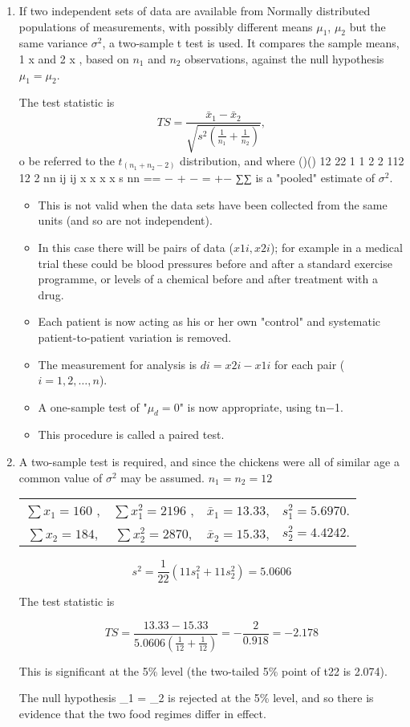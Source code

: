 \documentclass[a4paper,12pt]{article}
\begin{document}
\begin{enumerate} 
\item If two independent sets of data are available from Normally distributed populations of measurements, with possibly different means $\mu_1$, $\mu_2$ but the same variance $\sigma^2$, a two-sample t test is used.  It compares the sample means, 1 x and 2 x , based on $n_1$ and $n_2$ observations, against the null hypothesis $\mu_1 = \mu_2$. 
 
The test statistic is 
\[ TS = \frac{\bar{x}_1 - \bar{x}_2}{ \sqrt{ s^2 \left(  \frac{1}{n_1} + \frac{1}{n_2}  \right)} }, \]
o be referred to the $t_(n_1+n_2-2)$ distribution, and where 
 ()() 12 22 1 1 2 2 112
12 2
nn
ij ij x x x x
s
nn == − + −
=
+− ∑∑  is a "pooled" estimate of $\sigma^2$. 
 \begin{itemize}
     \item  This is not valid when the data sets have been collected from the same units (and so are not independent). 
     \item In this case there will be pairs of data ($x1i, x2i$);  for example in a medical trial these could be blood pressures before and after a standard exercise programme, or levels of a chemical before and after treatment with a drug. 
     \item Each patient is now acting as his or her own "control" and systematic patient-to-patient variation is removed. 
     \item The measurement for analysis is $di = x2i − x1i$ for each pair ($i = 1, 2, \ldots , n$).  \item A one-sample test of "$\mu_d = 0$" is now appropriate, using tn−1.  
     
     \item This procedure is called a paired test. 
 \end{itemize}

 
\item  A two-sample test is required, and since the chickens were all of similar age a common value of $\sigma^2$ may be assumed. 
$n_1 = n_2 = 12$

\begin{tabular}{cccc}
 $\sum x_1 = 160 $ ,&  $\sum x^2_1 = 2196 $ ,&  $\bar{x}_1= 13.33  $,&   $s^2_1 = 5.6970 $. \\
 $\sum x_2 =184  $,&  $\sum x^2_2 = 2870  $,& $\bar{x}_2 = 15.33  $,& $ s^2_2 = 4.4242 .$\\ 
\end{tabular} 

\[s^2 = \frac{1}{22} \left( 11 s_1^2 + 11 s^2_2 \right) = 5.0606\] 

The test statistic is 

\[ TS =  \frac{13.33 - 15.33}{5.0606 \left( \frac{1}{12} + \frac{1}{12} \right) } = - \frac{2}{0.918} = -2.178\]
 
This is significant at the 5\% level (the two-tailed 5\% point of t22 is 2.074). 
 
The null hypothesis \mu_1 = \mu_2 is rejected at the 5\% level, and so there is evidence that the two food regimes differ in effect. 

\end{enumerate}
\end{document}
